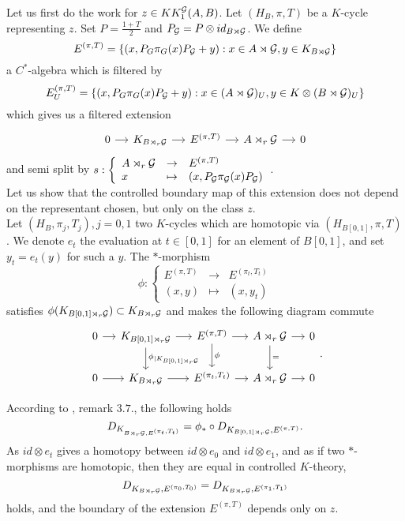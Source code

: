 Let us first do the work for $z\in KK_1^\mathcal G(A,B)$. Let $(H_B,\pi,T)$ be a $K$-cycle representing $z$. Set $P=\frac{1+T}{2}$ and $P_\mathcal G=P\otimes id_{B\rtimes \mathcal G}$. We define
\[E^{(\pi,T)}=\{(x,P_G\pi_G(x)P_\mathcal G + y) : x\in A\rtimes \mathcal G, y\in K_{B\rtimes\mathcal G}\}\]
a $C^*$-algebra which is filtered by
\[E_U^{(\pi,T)}=\{(x,P_G\pi_G(x)P_\mathcal G + y) : x\in (A\rtimes \mathcal G)_U, y\in K\otimes (B\rtimes\mathcal G)_U\}\]
which gives us a filtered extension
\[\begin{tikzcd}[column sep = small]
0\arrow{r} & K_{B\rtimes_r\G}\arrow{r} & E^{(\pi,T)} \arrow{r} & A\rtimes_r \G \arrow{r}& 0
\end{tikzcd}\]
and semi split by  $s :\left\{\begin{array}{lll}A\rtimes_r \mathcal G & \rightarrow & E^{(\pi,T)} \\ x & \mapsto & (x, P_\mathcal G \pi_\mathcal G(x)P_\mathcal G)\end{array}\right.$.\\

Let us show that the controlled boundary map of this extension does not depend on the representant chosen, but only on the class $z$.\\
Let $(H_B, \pi_j,T_j), j=0,1$ two $K$-cycles which are homotopic via $(H_{B[0,1]},\pi,T)$. We denote $e_t$ the evaluation at $t\in[0,1]$ for an element of $B[0,1]$, and set $y_t=e_t(y)$ for such a $y$. The $*$-morphism
\[\phi : \left\{\begin{array}{lll}E^{(\pi,T)} & \rightarrow & E^{(\pi_t,T_t)} \\ (x,y) & \mapsto & (x, y_t)\end{array}\right.\]
satisfies $\phi(K_{B[0,1] \rtimes_r \mathcal G})\subset K_{B \rtimes_r \mathcal G}$ and makes the following diagram commute
\[\begin{tikzcd}[column sep = small]
0\arrow{r} & K_{B[0,1] \rtimes_r \G}\arrow{r}\arrow{d}{\phi_{|K_{B[0,1] \rtimes_r \G}}} & E^{(\pi,T)} \arrow{r}\arrow{d}{\phi} & A\rtimes_r \G \arrow{r}\arrow{d}{=}& 0 \\
0\arrow{r} & K_{B \rtimes_r \G}\arrow{r} &  E^{(\pi_t,T_t)} \arrow{r} & A\rtimes_r \G \arrow{r} & 0
\end{tikzcd}.\]

According to \cite{OY2}, remark $3.7.$, the following holds
\[D_{K_{B\rtimes_r\mathcal G,E^{(\pi_t,T_t)}}} = \phi_* \circ D_{K_{B[0,1]\rtimes_r\mathcal G},E^{(\pi,T)}}.\]
As $id \otimes e_t$ gives a homotopy between $id\otimes e_0$ and $id\otimes e_1$, and as if two $*$-morphisms are homotopic, then they are equal in controlled $K$-theory, 
\[D_{K_{B\rtimes_r \mathcal G}, E^{(\pi_0,T_0)}}=D_{K_{B\rtimes_r \mathcal G}, E^{(\pi_1,T_1)}}\]
holds, and the boundary of the extension $E^{(\pi,T)}$ depends only on $z$.\\

